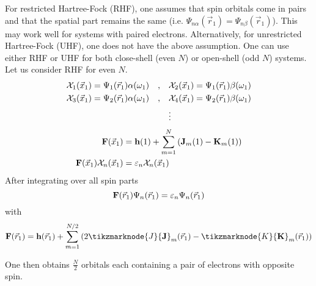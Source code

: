 \documentclass[12pt,a4paper,titlepage]{article}
\newcommand{\Chi}{\mathcal{X}} %
\begin{document}
For restricted Hartree-Fock (RHF), one assumes that spin orbitals come in pairs and that the spatial part remains the same (i.e. $\Psi_{n\alpha}(\vec{r}_{1})=\Psi_{n\beta}(\vec{r}_{1})$). This may work well for systems with paired electrons. Alternatively, for unrestricted Hartree-Fock (UHF), one does not have the above assumption. One can use either RHF or UHF for both close-shell (even $N$) or open-shell (odd $N$) systems.\\

Let us consider RHF for even $N$.
\begin{equation}
\begin{aligned}
\Chi_{1}(\vec{x}_{1})=\Psi_{1}(\vec{r}_{1})\alpha(\omega_{1})\qq{,}&\Chi_{2}(\vec{x}_{1})=\Psi_{1}(\vec{r}_{1})\beta(\omega_{1})\\
\Chi_{3}(\vec{x}_{1})=\Psi_{2}(\vec{r}_{1})\alpha(\omega_{1})\qq{,}&\Chi_{4}(\vec{x}_{1})=\Psi_{2}(\vec{r}_{1})\beta(\omega_{1})\\
& \vdots\\
\end{aligned}
\end{equation}
\begin{align}
\vb{F}(\vec{x}_{1})&=\vb{h}(1)+\sum_{m=1}^{N}\qty(\vb{J}_{m}(1)-\vb{K}_{m}(1))\\
\vb{F}(\vec{x}_{1})\Chi_{n}(\vec{x}_{1})&=\varepsilon_{n}\Chi_{n}(\vec{x}_{1})
\end{align}
After integrating over all spin parts
\begin{equation}
\vb{F}(\vec{r}_{1})\Psi_{n}(\vec{r}_{1})=\varepsilon_{n}\Psi_{n}(\vec{r}_{1})
\end{equation}
with
\begin{equation}
\vb{F}(\vec{r}_{1})=\vb{h}(\vec{r}_{1})+\sum_{m=1}^{N/2}\qty(2\tikzmarknode{J}{\vb{J}}_{m}(\vec{r}_{1})-\tikzmarknode{K}{\vb{K}}_{m}(\vec{r}_{1}))
\end{equation}
\begin{center}
\end{center}
One then obtains $\frac{N}{2}$ orbitals each containing a pair of electrons with opposite spin.
\end{document}
